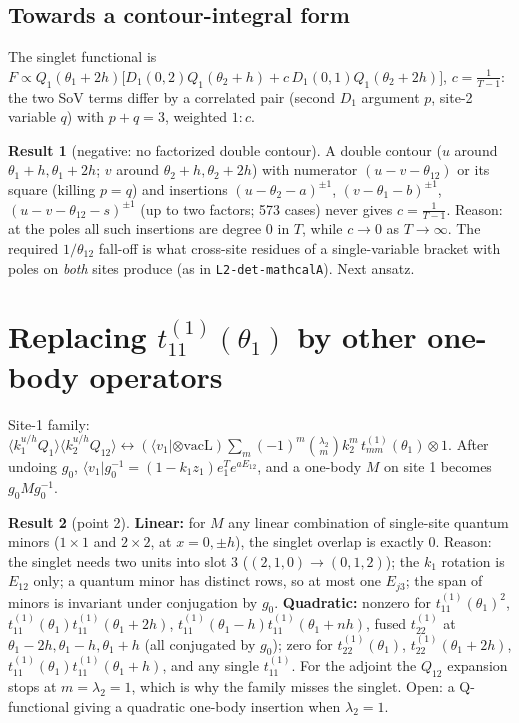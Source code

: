 \documentclass[11pt]{article}
\newcommand{\nb}[1]{\texttt{#1}}
\theoremstyle{definition}
\newtheorem{result}{Result}
\theoremstyle{remark}
\begin{document}
\subsection*{Towards a contour-integral form}
The singlet functional is
$F\propto Q_1(\theta_1+2h)\big[D_1(0,2)Q_1(\theta_2+h)+c\,D_1(0,1)Q_1(\theta_2+2h)\big]$, $c=\frac1{T-1}$: the two SoV terms differ by a correlated pair (second $D_1$ argument $p$, site-2 variable $q$) with $p+q=3$, weighted $1:c$.

\begin{result}[negative: no factorized double contour]
A double contour ($u$ around $\theta_1+h,\theta_1+2h$; $v$ around $\theta_2+h,\theta_2+2h$) with numerator $(u-v-\theta_{12})$ or its square (killing $p=q$) and insertions $(u-\theta_2-a)^{\pm1}$, $(v-\theta_1-b)^{\pm1}$, $(u-v-\theta_{12}-s)^{\pm1}$ (up to two factors; 573 cases) never gives $c=\frac1{T-1}$. Reason: at the poles all such insertions are degree 0 in $T$, while $c\to0$ as $T\to\infty$. The required $1/\theta_{12}$ fall-off is what cross-site residues of a single-variable bracket with poles on \emph{both} sites produce (as in \nb{L2-det-mathcalA}). Next ansatz.
\end{result}

\section{Replacing $t^{(1)}_{11}(\theta_1)$ by other one-body operators}

Site-1 family: $\langle k_1^{u/h}Q_1\rangle\langle k_2^{u/h}Q_{12}\rangle\leftrightarrow(\langle v_1|\otimes\mathrm{vacL})\sum_m(-1)^m\binom{\lambda_2}{m}k_2^m\,t^{(1)}_{mm}(\theta_1)\otimes1$. After undoing $g_0$, $\langle v_1|g_0^{-1}=(1-k_1z_1)e_1^Te^{aE_{12}}$, and a one-body $M$ on site 1 becomes $g_0Mg_0^{-1}$.

\begin{result}[point 2]
\textbf{Linear:} for $M$ any linear combination of single-site quantum minors ($1\times1$ and $2\times2$, at $x=0,\pm h$), the singlet overlap is exactly $0$. Reason: the singlet needs two units into slot 3 ($(2,1,0)\to(0,1,2)$); the $k_1$ rotation is $E_{12}$ only; a quantum minor has distinct rows, so at most one $E_{j3}$; the span of minors is invariant under conjugation by $g_0$.
\textbf{Quadratic:} nonzero for $t^{(1)}_{11}(\theta_1)^2$, $t^{(1)}_{11}(\theta_1)t^{(1)}_{11}(\theta_1+2h)$, $t^{(1)}_{11}(\theta_1-h)t^{(1)}_{11}(\theta_1+nh)$, fused $t^{(1)}_{22}$ at $\theta_1-2h,\theta_1-h,\theta_1+h$ (all conjugated by $g_0$); zero for $t^{(1)}_{22}(\theta_1)$, $t^{(1)}_{22}(\theta_1+2h)$, $t^{(1)}_{11}(\theta_1)t^{(1)}_{11}(\theta_1+h)$, and any single $t^{(1)}_{11}$.
For the adjoint the $Q_{12}$ expansion stops at $m=\lambda_2=1$, which is why the family misses the singlet. Open: a Q-functional giving a quadratic one-body insertion when $\lambda_2=1$.
\end{result}
\end{document}
